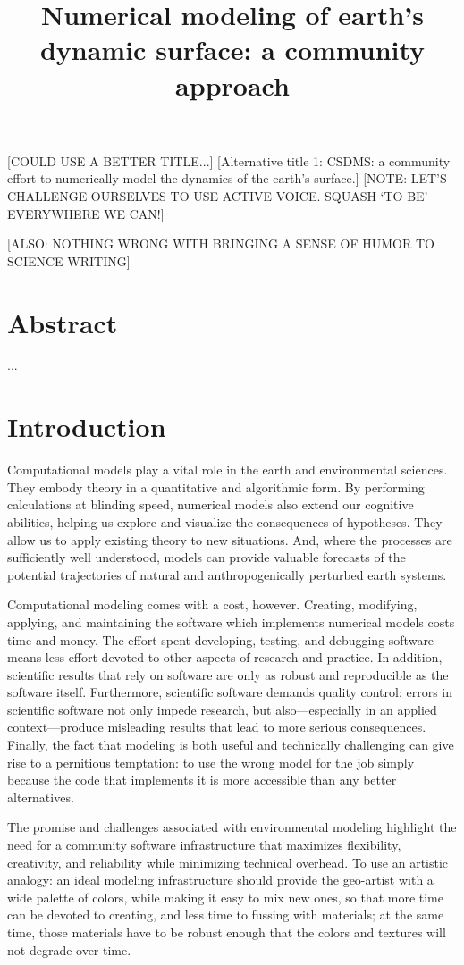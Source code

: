 \documentclass[12pt]{amsart}
\title{Numerical modeling of earth's dynamic surface: a community approach}
\author{}
\date{} %
\begin{document}
\maketitle

[COULD USE A BETTER TITLE...]
[Alternative title 1: CSDMS: a community effort to numerically model the dynamics of the earth’s surface.]
[NOTE: LET'S CHALLENGE OURSELVES TO USE ACTIVE VOICE. SQUASH `TO BE' EVERYWHERE WE CAN!]

[ALSO: NOTHING WRONG WITH BRINGING A SENSE OF HUMOR TO SCIENCE WRITING]

\section*{Abstract}

...


\section{Introduction}

Computational models play a vital role in the earth and environmental sciences. They embody theory in a quantitative and algorithmic form. By performing calculations at blinding speed, numerical models also extend our cognitive abilities, helping us explore and visualize the consequences of hypotheses. They allow us to apply existing theory to new situations. And, where the processes are sufficiently well understood, models can provide valuable forecasts of the potential trajectories of natural and anthropogenically perturbed earth systems.

Computational modeling comes with a cost, however. Creating, modifying, applying, and maintaining the software which implements numerical models costs time and money. The effort spent developing, testing, and debugging software means less effort devoted to other aspects of research and practice. In addition, scientific results that rely on software are only as robust and reproducible as the software itself. Furthermore, scientific software demands quality control: errors in scientific software not only impede research, but also---especially in an applied context---produce misleading results that lead to more serious consequences. Finally, the fact that modeling is both useful and technically challenging can give rise to a pernitious temptation: to use the wrong model for the job simply because the code that implements it is more accessible than any better alternatives. 

The promise and challenges associated with environmental modeling highlight the need for a community software infrastructure that maximizes flexibility, creativity, and reliability while minimizing technical overhead. To use an artistic analogy: an ideal modeling infrastructure should provide the geo-artist with a wide palette of colors, while making it easy to mix new ones, so that more time can be devoted to creating, and less time to fussing with materials; at the same time, those materials have to be robust enough that the colors and textures will not degrade over time.
\end{document}
